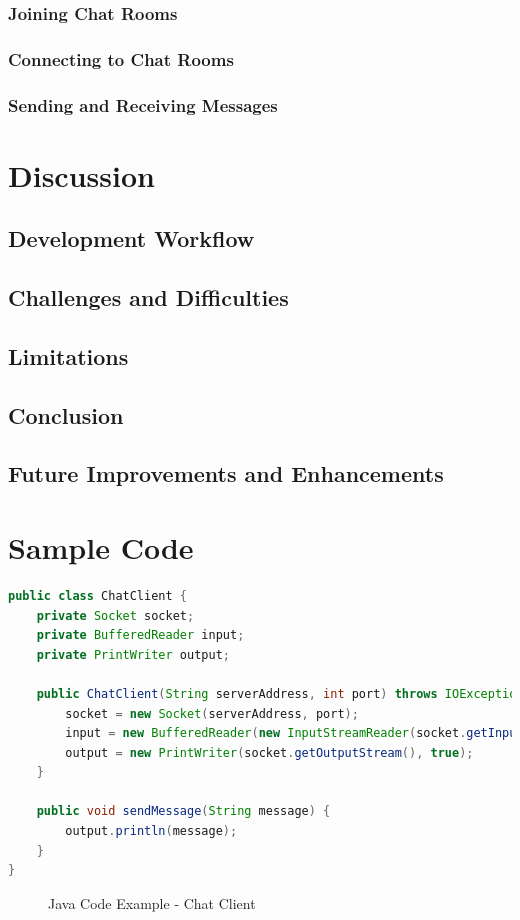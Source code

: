 \documentclass[a4paper,11pt]{article}
\begin{document}
\subsubsection{Joining Chat Rooms}
\subsubsection{Connecting to Chat Rooms}
\subsubsection{Sending and Receiving Messages}

\section{Discussion}
\subsection{Development Workflow}
\subsection{Challenges and Difficulties}
\subsection{Limitations}
\subsection{Conclusion}
\subsection{Future Improvements and Enhancements}

\newpage
\section{Sample Code}
\begin{lstlisting}[language=Java, caption=Example Code]
public class ChatClient {
    private Socket socket;
    private BufferedReader input;
    private PrintWriter output;

    public ChatClient(String serverAddress, int port) throws IOException {
        socket = new Socket(serverAddress, port);
        input = new BufferedReader(new InputStreamReader(socket.getInputStream()));
        output = new PrintWriter(socket.getOutputStream(), true);
    }

    public void sendMessage(String message) {
        output.println(message);
    }
}
\end{lstlisting}
\begin{figure}[h]\centering\caption{Java Code Example - Chat Client}\end{figure}
\end{document}
